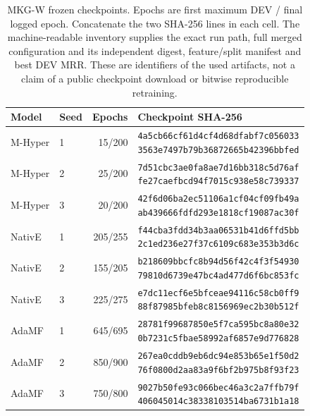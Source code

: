 \begin{table}[htbp]
\centering\footnotesize
\caption{MKG-W frozen checkpoints. Epochs are first maximum DEV / final logged epoch. Concatenate the two SHA-256 lines in each cell. The machine-readable inventory supplies the exact run path, full merged configuration and its independent digest, feature/split manifest and best DEV MRR. These are identifiers of the used artifacts, not a claim of a public checkpoint download or bitwise reproducible retraining.}
\label{tab:training-hashes-mkg_w}
\begin{tabular}{llrl}
\toprule
Model & Seed & Epochs & Checkpoint SHA-256\\
\midrule
M-Hyper & 1 & 15/200 & \shortstack[l]{\texttt{4a5cb66cf61d4cf4d68dfabf7c056033}\\\texttt{3563e7497b79b36872665b42396bbfed}}\\[3pt]
M-Hyper & 2 & 25/200 & \shortstack[l]{\texttt{7d51cbc3ae0fa8ae7d16bb318c5d76af}\\\texttt{fe27caefbcd94f7015c938e58c739337}}\\[3pt]
M-Hyper & 3 & 20/200 & \shortstack[l]{\texttt{42f6d06ba2ec51106a1cf04cf09fb49a}\\\texttt{ab439666fdfd293e1818cf19087ac30f}}\\[3pt]
NativE & 1 & 205/255 & \shortstack[l]{\texttt{f44cba3fdd34b3aa06531b41d6ffd5bb}\\\texttt{2c1ed236e27f37c6109c683e353b3d6c}}\\[3pt]
NativE & 2 & 155/205 & \shortstack[l]{\texttt{b218609bbcfc8b94d56f42c4f3f54930}\\\texttt{79810d6739e47bc4ad477d6f6bc853fc}}\\[3pt]
NativE & 3 & 225/275 & \shortstack[l]{\texttt{e7dc11ecf6e5bfceae94116c58cb0ff9}\\\texttt{88f87985bfeb8c8156969ec2b30b512f}}\\[3pt]
AdaMF & 1 & 645/695 & \shortstack[l]{\texttt{28781f99687850e5f7ca595bc8a80e32}\\\texttt{0b7231c5fbae58992af6857e9d776828}}\\[3pt]
AdaMF & 2 & 850/900 & \shortstack[l]{\texttt{267ea0cddb9eb6dc94e853b65e1f50d2}\\\texttt{76f0800d2aa83a9f6bf2b975b8f93f23}}\\[3pt]
AdaMF & 3 & 750/800 & \shortstack[l]{\texttt{9027b50fe93c066bec46a3c2a7ffb79f}\\\texttt{406045014c38338103514ba6731b1a18}}\\[3pt]
\bottomrule
\end{tabular}
\end{table}
